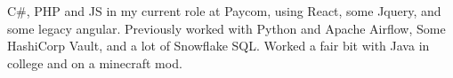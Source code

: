 

\begin{cvparagraph}

C\#, PHP and JS in my current role at Paycom, using React, some Jquery, and some legacy angular. Previously worked with Python and Apache Airflow, Some HashiCorp Vault, and a lot of Snowflake SQL. Worked a fair bit with Java in college and on a minecraft mod.
\end{cvparagraph}

